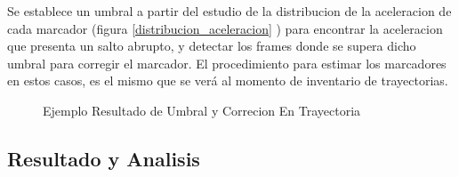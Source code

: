 \begin{itemize}
Se establece un umbral a partir del estudio de la distribucion de la aceleracion de cada marcador (figura \ref{distribucion_aceleracion} ) para encontrar la aceleracion que presenta un salto abrupto, y detectar los frames donde se supera dicho umbral para corregir el marcador. El procedimiento para estimar los marcadores en estos casos, es el mismo que se verá al momento de inventario de trayectorias.
\begin{figure}[H]
 \centering
 \caption{Ejemplo Resultado de Umbral y Correcion En Trayectoria}
\label{distro_acc_track_m13_fix}
\end{figure}

\end{itemize}




\subsection{Resultado y Analisis}


